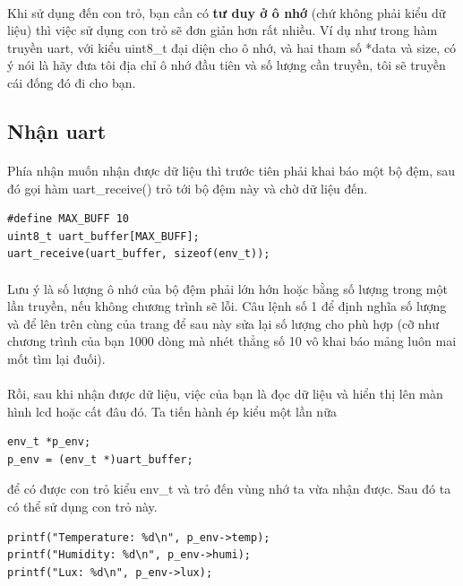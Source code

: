\documentclass[12pt,a5paper]{book}
\begin{document}
\paragraph{}
Khi sử dụng đến con trỏ, bạn cần có \textbf{tư duy ở ô nhớ} (chứ không phải kiểu dữ liệu) thì việc sử dụng con trỏ sẽ đơn giản hơn rất nhiều. Ví dụ như trong hàm truyền uart, với kiểu uint8\_t đại diện cho ô nhớ, và hai tham số *data và size, có ý nói là hãy đưa tôi địa chỉ ô nhớ đầu tiên và số lượng cần truyền, tôi sẽ truyền cái đống đó đi cho bạn.
\subsection{Nhận uart}
\paragraph{}
Phía nhận muốn nhận được dữ liệu thì trước tiên phải khai báo một bộ đệm, sau đó gọi hàm uart\_receive() trỏ tới bộ đệm này và chờ dữ liệu đến.
\begin{lstlisting}
#define MAX_BUFF 10
uint8_t uart_buffer[MAX_BUFF];
uart_receive(uart_buffer, sizeof(env_t));
\end{lstlisting}
\paragraph{}
Lưu ý là số lượng ô nhớ của bộ đệm phải lớn hớn hoặc bằng số lượng trong một lần truyền, nếu không chương trình sẽ lỗi. Câu lệnh số 1 để định nghĩa số lượng và để lên trên cùng của trang để sau này sửa lại số lượng cho phù hợp (cỡ như chương trình của bạn 1000 dòng mà nhét thẳng số 10 vô khai báo mảng luôn mai mốt tìm lại đuối).
\paragraph{}
Rồi, sau khi nhận được dữ liệu, việc của bạn là đọc dữ liệu và hiển thị lên màn hình lcd hoặc cất đâu đó. Ta tiến hành ép kiểu một lần nữa
\begin{lstlisting}
env_t *p_env;
p_env = (env_t *)uart_buffer;

\end{lstlisting}
để có được con trỏ kiểu env\_t và trỏ đến vùng nhớ ta vừa nhận được. Sau đó ta có thể sử dụng con trỏ này.
\begin{lstlisting}
printf("Temperature: %d\n", p_env->temp);
printf("Humidity: %d\n", p_env->humi);
printf("Lux: %d\n", p_env->lux);

\end{lstlisting}
\end{document}
